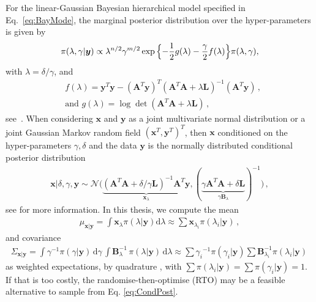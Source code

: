 For the linear-Gaussian Bayesian hierarchical model specified in Eq.~\ref{eq:BayMode}, the marginal posterior distribution over the hyper-parameters is given by
\begin{align}
	\pi(\lambda, \gamma | \bm{y})
	\propto  \lambda^{n/2} \gamma^{m/2}   \exp{ \Bigl\{ - \frac{1}{2} g ( \lambda) - \frac{\gamma}{2} f ( \lambda) \Bigr\} } \pi(\lambda, \gamma),
	\label{eq:MargPostAppl}
\end{align}
with $\lambda = \delta / \gamma$, and
\begin{subequations}
	\label{eq:fandg}
	\begin{align}
		&f ( \lambda) = \bm{y}^T \bm{y} - (\bm{A}^T \bm{y})^T (\bm{A}^T  \bm{A} + \lambda \bm{L})^{-1} (\bm{A}^T \bm{y})  \, ,  \\
		&\text{and } g(\lambda) = \log \det (\bm{A}^T  \bm{A} + \lambda \bm{L}) \, ,
	\end{align}
\end{subequations}
see~\cite[Lemma 2]{fox2016fast}.
When considering $\bm{x}$ and $\bm{y}$ as a joint multivariate normal distribution or a joint Gaussian Markov random field $(\bm{x}^T,\bm{y}^T)^T$, then $\bm{x}$ conditioned on the hyper-parameters $\gamma, \delta$ and the data $\bm{y}$ is the normally distributed conditional posterior distribution
\begin{align}
	\bm{x}| \delta, \gamma, \bm{y}  \sim \mathcal{N}\big( \underbrace{ (\bm{A}^T \bm{A} + \delta / \gamma \bm{L} )^{-1} \bm{A}^T \bm{y}}_{\bm{x}_{\lambda}}, ( \underbrace{ \gamma \bm{A}^T \bm{A} + \delta \bm{L} }_{\gamma \bm{B}_{\lambda}}  )^{-1} \big) \, \label{eq:CondPost},
\end{align}
see \cite{SIMPSON201216, rue2005gaussian, fox2016fast} for more information.
In this thesis, we compute the mean
\begin{align}
	\mu_{\bm{x}|\bm{y}} = \int \bm{x}_{\lambda} \pi(\lambda| \bm{y}) \text{d}\lambda \approx \sum \bm{x}_{\lambda_i} \pi(\lambda_i| \bm{y}) \, , \label{eq:MeanInt}
\end{align} and covariance
\begin{align}
	\Sigma_{\bm{x}|\bm{y}} = \int \gamma^{-1}  \pi(\gamma | \bm{y} ) \, \text{d} \gamma \, \int  \bm{B}_{\lambda}^{-1} \, \pi(\lambda | \bm{y} )  \, \text{d} \lambda  \approx \sum {\gamma_i}^{-1}\pi(\gamma_i| \bm{y}) \sum \bm{B}_{\lambda_i}^{-1}\pi(\lambda_i| \bm{y})\, \label{eq:CovInt}
\end{align}
as weighted expectations, by quadrature \cite[Sec. 2.1]{Dick_Kuo_Sloan_2013}, with $\sum \pi(\lambda_i| \bm{y}) = \sum \pi(\gamma_i| \bm{y}) = 1$.
If that is too costly, the randomise-then-optimise (RTO) \cite{bardsley2015randomize, fox2016fast} may be a feasible alternative to sample from Eq. \ref{eq:CondPost}.

